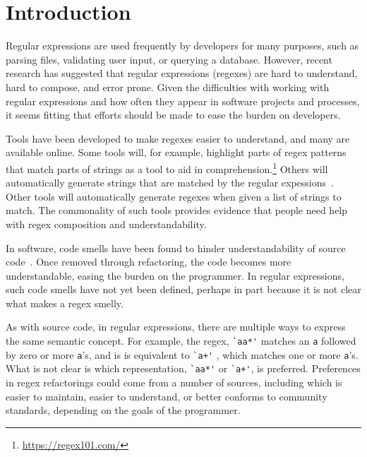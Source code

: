 \section{Introduction }

Regular expressions are used frequently by developers for many purposes, such as parsing files, validating user input, or querying a database. 
However, recent research has suggested that regular expressions (regexes) are hard to understand, hard to compose, and error prone. 
Given the difficulties with working with regular expressions and how often they appear in software projects and processes, it seems fitting that efforts should be made to ease the burden on developers. 

Tools have been developed to make regexes easier to understand, and many are available online. 
Some tools will, for example, highlight parts of regex patterns that match parts of strings as a tool to aid in comprehension.\footnote{\url{https://regex101.com/}} 
Others will automatically generate strings that are matched by the regular expessions~\cite{}. 
Other tools will automatically generate regexes when given a list of strings to match. 
The commonality of such tools provides evidence that people need help with regex composition and understandability. 

In software, code smells have been found to hinder understandability of source code~\cite{}. 
Once removed through refactoring, the code becomes more understandable, easing the burden on the programmer. 
In regular expressions, such code smells have not yet been defined, perhaps in part because it is not clear what makes a regex smelly. 

As with source code, in regular expressions, there are multiple ways to express the same semantic concept. 
For example, the regex, \verb!`aa*'! matches an \verb!a! followed by zero or more \verb!a!'s, and is is equivalent to \verb!`a+'! , which matches one or more \verb!a!'s. 
What is not clear is which representation,  \verb!`aa*'!  or  \verb!`a+'!, is preferred. 
Preferences in regex refactorings could come from a number of sources, including which is easier to maintain, easier to understand, or better conforms to community standards, depending on the goals of the programmer.  

